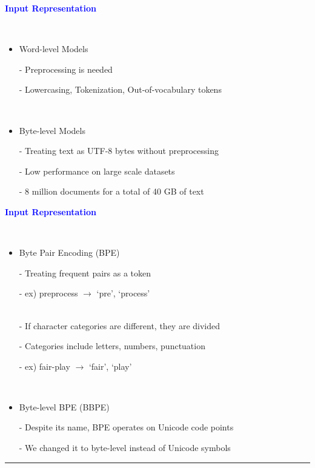 \documentclass[professionalfont]{beamer}
\begin{document}
\begin{frame}
\begin{center}
    { \textbf{\textcolor{blue}{ {\fontsize{12}{14}\selectfont Input Representation} }} }
\end{center}
\\[0.5cm]

{\fontsize{10}{14}\selectfont 
\begin{itemize}
    \item Word-level Models
    
    - Preprocessing is needed

    - Lowercasing, Tokenization, Out-of-vocabulary tokens

    \\[0.5cm]

    \item Byte-level Models

    - Treating text as UTF-8 bytes without preprocessing

    - Low performance on large scale datasets

    - 8 million documents for a total of 40 GB of text
\end{itemize}
}

\end{frame}
\begin{frame}
\begin{refsection}

\begin{center}
    { \textbf{\textcolor{blue}{ {\fontsize{12}{14}\selectfont Input Representation} }} }
\end{center}
\\[0.5cm]

{\fontsize{10}{14}\selectfont 
\begin{itemize}
    \item Byte Pair Encoding (BPE) \cite{BPE}

    - Treating frequent pairs as a token

    - ex) preprocess \( \rightarrow \) `pre', `process'

    \\[0.3cm]

    - If character categories are different, they are divided

    - Categories include letters, numbers, punctuation

    - ex) fair-play \( \rightarrow \) `fair', `play'

    \\[0.5cm]

    \item Byte-level BPE (BBPE)

    - Despite its name, BPE operates on Unicode code points

    - We changed it to byte-level instead of Unicode symbols
\end{itemize}
}

\vspace{0.3cm}
\hrule
\printbibliography

\end{refsection}
\end{frame}
\end{document}
